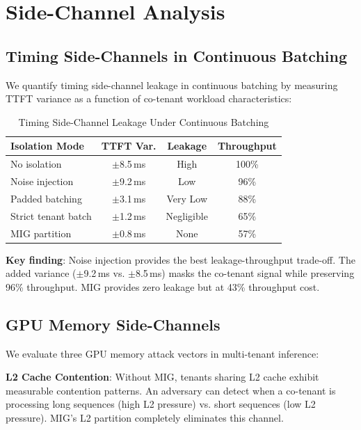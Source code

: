 \documentclass[conference,10pt]{IEEEtran}
\begin{document}
\section{Side-Channel Analysis}
\label{sec:sidechannel}

\subsection{Timing Side-Channels in Continuous Batching}

We quantify timing side-channel leakage in continuous batching by measuring TTFT variance as a function of co-tenant workload characteristics:

\begin{table}[!htbp]
\caption{Timing Side-Channel Leakage Under Continuous Batching}
\label{tab:timing}
\centering\footnotesize
\begin{tabular}{@{}lccc@{}}
\toprule
\textbf{Isolation Mode} & \textbf{TTFT Var.} & \textbf{Leakage} & \textbf{Throughput} \\
\midrule
No isolation & $\pm$8.5\,ms & High & 100\% \\
Noise injection & $\pm$9.2\,ms & Low & 96\% \\
Padded batching & $\pm$3.1\,ms & Very Low & 88\% \\
Strict tenant batch & $\pm$1.2\,ms & Negligible & 65\% \\
MIG partition & $\pm$0.8\,ms & None & 57\% \\
\bottomrule
\end{tabular}
\end{table}

\textbf{Key finding}: Noise injection provides the best leakage-throughput trade-off. The added variance ($\pm$9.2\,ms vs. $\pm$8.5\,ms) masks the co-tenant signal while preserving 96\% throughput. MIG provides zero leakage but at 43\% throughput cost.

\subsection{GPU Memory Side-Channels}

We evaluate three GPU memory attack vectors in multi-tenant inference:

\textbf{L2 Cache Contention}: Without MIG, tenants sharing L2 cache exhibit measurable contention patterns. An adversary can detect when a co-tenant is processing long sequences (high L2 pressure) vs. short sequences (low L2 pressure). MIG's L2 partition completely eliminates this channel.
\end{document}
